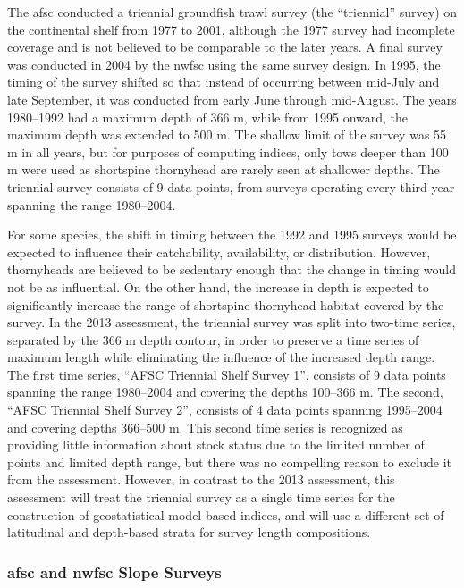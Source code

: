 \documentclass[11pt,
  english,
  letterpaper,
]{article}
\begin{document}
The \gls{afsc} conducted a triennial groundfish trawl survey (the ``triennial'' survey) on the continental shelf from 1977 to 2001, although the 1977 survey had incomplete coverage and is not believed to be comparable to the later years. A final survey was conducted in 2004 by the \gls{nwfsc} using the same survey design. In 1995, the timing of the survey shifted so that instead of occurring between mid-July and late September, it was conducted from early June through mid-August. The years 1980--1992 had a maximum depth of 366 m, while from 1995 onward, the maximum depth was extended to 500 m. The shallow limit of the survey was 55 m in all years, but for purposes of computing indices, only tows deeper than 100 m were used as shortspine thornyhead are rarely seen at shallower depths. The triennial survey consists of 9 data points, from surveys operating every third year spanning the range 1980--2004.

For some species, the shift in timing between the 1992 and 1995 surveys would be expected to influence their catchability, availability, or distribution. However, thornyheads are believed to be sedentary enough that the change in timing would not be as influential. On the other hand, the increase in depth is expected to significantly increase the range of shortspine thornyhead habitat covered by the survey. In the 2013 assessment, the triennial survey was split into two-time series, separated by the 366 m depth contour, in order to preserve a time series of maximum length while eliminating the influence of the increased depth range. The first time series, ``AFSC Triennial Shelf Survey 1'', consists of 9 data points spanning the range 1980--2004 and covering the depths 100--366 m. The second, ``AFSC Triennial Shelf Survey 2'', consists of 4 data points spanning 1995--2004 and covering depths 366--500 m. This second time series is recognized as providing little information about stock status due to the limited number of points and limited depth range, but there was no compelling reason to exclude it from the assessment. However, in contrast to the 2013 assessment, this assessment will treat the triennial survey as a single time series for the construction of geostatistical model-based indices, and will use a different set of latitudinal and depth-based strata for survey length compositions.

\hypertarget{and-slope-surveys}{%
\subsubsection{\texorpdfstring{\acrshort{afsc} and \acrshort{nwfsc} Slope Surveys}{ and  Slope Surveys}}\label{and-slope-surveys}}
\end{document}
